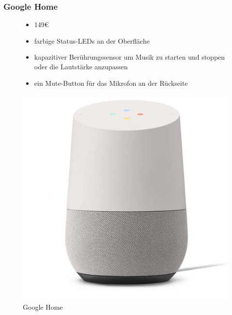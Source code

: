 \subsubsection{Google Home}
\begin{figure}[H]
	\begin{minipage}{0.45\textwidth}
	  \begin{itemize}
	  \item 149€
	  \item farbige Status-LEDs an der Oberfläche
	  \item kapazitiver Berührungssensor um Musik zu starten und stoppen oder die Lautstärke anzupassen
	  \item ein Mute-Button für das Mikrofon an der Rückseite
	  \end{itemize}
	\end{minipage}
	\hfill
	\begin{minipage}{0.45\textwidth}
	  \centering
	  \includegraphics[width=\textwidth]{content/img/GoogleHome}
	  \caption[Google Home]{Google Home}
	\end{minipage}
\end{figure}

